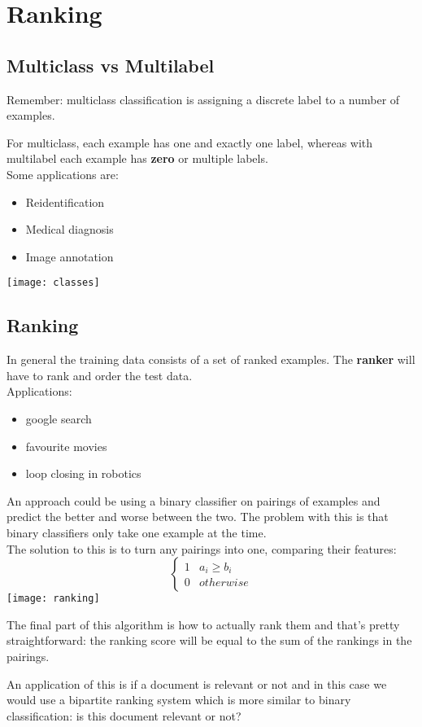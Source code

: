 \chapter{Ranking}

\section{Multiclass vs Multilabel}
Remember: multiclass classification is assigning a discrete label to a number of examples. 

For multiclass, each example has one and exactly one label, whereas with multilabel each example has 
{\bf zero} or multiple labels. \\
Some applications are: 
\begin{itemize}
	\item Reidentification
	\item Medical diagnosis
	\item Image annotation
\end{itemize}

\texttt{[image: classes]}
\newpage
\section{Ranking}
In general the training data consists of a set of ranked examples. The {\bf ranker} will have to rank and order the test data. \\
Applications:
\begin{itemize}
	\item google search
	\item favourite movies
	\item loop closing in robotics
\end{itemize}

An approach could be using a binary classifier on pairings of examples and predict the better and worse between the two. The problem with this is that binary classifiers only take one example at the time.\\
The solution to this is to turn any pairings into one, comparing their features: 
\begin{equation}
	\begin{cases}
	1 & a_i \geq b_i \\
	0 & otherwise
	\end{cases}
\end{equation}
\texttt{[image: ranking]}

The final part of this algorithm is how to actually rank them and that's pretty straightforward: the ranking score will be equal to the sum of the rankings in the pairings. 

An application of this is if a document is relevant or not and in this case we would use a bipartite ranking system which is more similar to binary classification: is this document relevant or not? 
